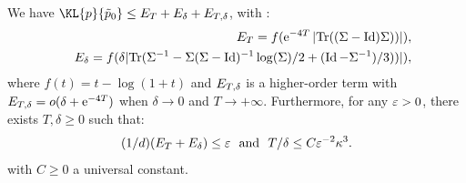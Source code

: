 \documentclass{article}
\begin{document}


\begin{theorem}
  \label{prop:approx_gaussian_kl}
  We have $\KL{p}{\tilde{p}_0} \leq \error_{T} + \error_{\delta} + \error_{T, \delta}$, with :
     \begin{eqnarray}
  \label{firsteq0}
    &&{E}_T =  f(\mathrm{e}^{-4T}\,\vert \mathrm{Tr}((\Sigma - \operatorname{Id})\Sigma)) \vert) , \\ 
     \label{firsteq0}
    &&{E}_{\delta} = f(\delta \vert \mathrm{Tr}(\Sigma^{-1} - \Sigma (\Sigma - \operatorname{Id})^{-1} \log(\Sigma)/2 + (\operatorname{Id} - \Sigma^{-1})/3)) \vert)  ,
  \end{eqnarray}
  where $f(t) = t-\log(1+t)$ and ${E}_{T, \delta}$ is a higher-order term with $E_{T, \delta} = o(\delta + \mathrm{e}^{-4T})$ when $\delta \to 0$ and $T \to +\infty$. Furthermore, for any $\varepsilon > 0$,
  there exists $T, \delta \geq 0$ such that:
  \begin{equation}
    \label{eq:N_conditioning}
    (1/d) ({E}_T + {E}_\delta) \leq \varepsilon~~\mbox{and}~~
    T/\delta \leq C \varepsilon^{-2} \kappa^3  .
  \end{equation}
  with $C \geq 0$ a universal constant.
  \end{theorem}
\end{document}
